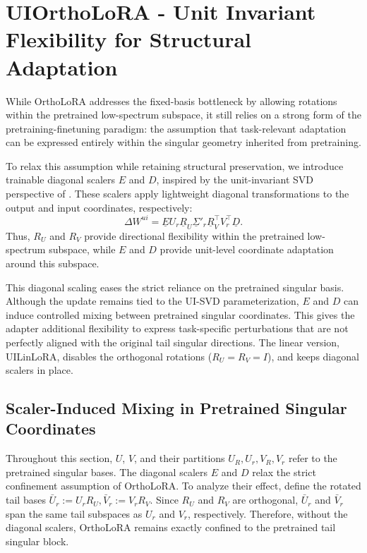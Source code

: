 \section{UIOrthoLoRA - Unit Invariant Flexibility for Structural Adaptation}
\label{sec:uiortholora}

While OrthoLoRA addresses the fixed-basis bottleneck by allowing rotations within
the pretrained low-spectrum subspace, it still relies on a strong form of the
pretraining-finetuning paradigm: the assumption that task-relevant adaptation
can be expressed entirely within the singular geometry inherited from
pretraining.

To relax this assumption while retaining structural preservation, we introduce
trainable diagonal scalers $E$ and $D$, inspired by the unit-invariant SVD
perspective of \citet{uhlmann2018generalized}. These scalers apply lightweight
diagonal transformations to the output and input coordinates, respectively:
\[
\Delta W^{ui}
=
\underline E U_r \underline R_U \underline \Sigma'_r \underline R_V^\top V_r^\top \underline D .
\]
Thus, $R_U$ and $R_V$ provide directional flexibility within the pretrained
low-spectrum subspace, while $E$ and $D$ provide unit-level coordinate
adaptation around this subspace.

This diagonal scaling eases the strict reliance on the pretrained singular basis. Although the update remains tied to the UI-SVD parameterization, $E$ and $D$ can induce controlled mixing between pretrained singular coordinates. This gives the adapter additional flexibility to express task-specific perturbations that are not perfectly aligned with the original tail singular directions. The linear version, UILinLoRA, disables the orthogonal rotations ($R_U = R_V = I$), and keeps diagonal scalers in place.

\subsection{Scaler-Induced Mixing in Pretrained Singular Coordinates}
Throughout this section, \(U\), \(V\), and their partitions \(U_R, U_r, V_R, V_r\) refer to the pretrained singular bases. The diagonal scalers $E$ and $D$ relax the strict confinement assumption of
OrthoLoRA. To analyze their effect, define the rotated tail bases $\bar{U}_r := U_r R_U, \bar{V}_r := V_r R_V .$
Since $R_U$ and $R_V$ are orthogonal, $\bar{U}_r$ and $\bar{V}_r$ span the same
tail subspaces as $U_r$ and $V_r$, respectively. Therefore, without the diagonal
scalers, OrthoLoRA remains exactly confined to the pretrained tail singular
block.

